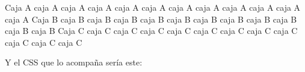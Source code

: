 \documentclass[letterpaper,10pt,spanish]{sphinxmanual}
\begin{document}
\begin{sphinxVerbatim}[commandchars=\\\{\}]
     
        Caja A caja A caja A caja A
        caja A caja A caja A caja A
        caja A caja A caja A caja A
     
        Caja B caja B caja B caja B
        caja B caja B caja B caja B
        caja B caja B caja B caja B
     
        Caja C caja C caja C caja C
        caja C caja C caja C caja C
        caja C caja C caja C caja C
\end{sphinxVerbatim}

Y el CSS que lo acompaña sería este:
\end{document}
